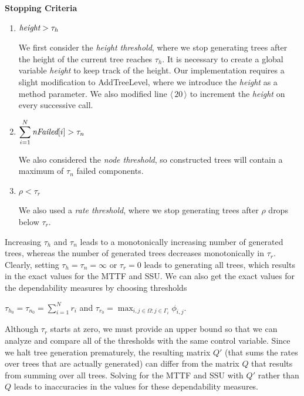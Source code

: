 \documentclass[12pt]{article}
\newcommand{\varName}[1]{\textrm{\it#1}}
\newcommand{\citeLine}[1]{$\langle \, #1 \, \rangle$}
\begin{document}
\vspace{1em}
\noindent\textbf{Stopping Criteria}
\begin{enumerate}
\item $\varName{height} > \tau_h$

We first consider the \textit{height threshold}, where we stop generating
trees after the height of the current tree reaches $\tau_h$. It is necessary
to create a global variable \varName{height} to keep track of the height.  Our
implementation requires a slight modification to \mbox{AddTreeLevel}, where we
introduce the \varName{height} as a method parameter. We also modified line
\citeLine{20} to increment the \varName{height} on every successive call.

\item $\displaystyle\sum_{i=1}^N \varName{nFailed}[i] > \tau_n$

We also considered the  \textit{node threshold}, so constructed trees will
contain a maximum of $\tau_n$ failed components.

\item $\rho < \tau_r$

We also used a \textit{rate threshold}, where we stop generating trees after
$\rho$ drops below $\tau_r$.
\end{enumerate}


Increasing $\tau_h$ and $\tau_n$ leads to a monotonically increasing number of
generated trees, whereas the number of generated trees decreases monotonically
in $\tau_r$. Clearly, setting $\tau_h = \tau_n = \infty$ or $\tau_r = 0$ leads
to generating all trees, which results in the exact values for the MTTF and
SSU.  We can also get the exact values for the dependability measures by
choosing thresholds

$\tau_{h_0} = \tau_{n_0} = \displaystyle\sum_{i=1}^N r_i$ and $\tau_{r_0} = 
\max_{i,j \in \Omega : j \in \Gamma_i} \phi_{i,j}$.

Although $\tau_r$ starts at zero, we must provide an upper bound so that we
can analyze and compare all of the thresholds with the same control variable.
Since we halt tree generation prematurely, the resulting matrix $Q'$ (that
sums the rates over trees that are actually generated) can differ from the
matrix $Q$ that results from summing over all trees. Solving for the MTTF and
SSU with $Q'$ rather than $Q$ leads to inaccuracies in the values for these
dependability measures.

\end{document}
